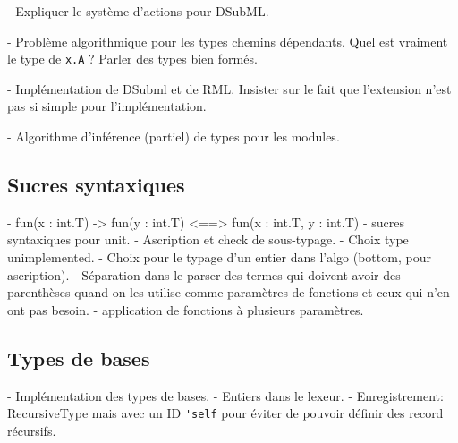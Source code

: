 - Expliquer le système d'actions pour DSubML.

- Problème algorithmique pour les types chemins dépendants. Quel est vraiment le
type de \verb|x.A| ? Parler des types bien formés.

- Implémentation de DSubml et de RML. Insister sur le fait que l'extension n'est
pas si simple pour l'implémentation.

- Algorithme d'inférence (partiel) de types pour les modules.

\subsection{Sucres syntaxiques}

- fun(x : int.T) -> fun(y : int.T) <==> fun(x : int.T, y : int.T)
- sucres syntaxiques pour unit.
- Ascription et check de sous-typage.
- Choix type unimplemented.
- Choix pour le typage d'un entier dans l'algo (bottom, pour ascription).
- Séparation dans le parser des termes qui doivent avoir des parenthèses quand
on les utilise comme paramètres de fonctions et ceux qui n'en ont pas besoin.
- application de fonctions à plusieurs paramètres.

\subsection{Types de bases}

- Implémentation des types de bases.
- Entiers dans le lexeur.
- Enregistrement: RecursiveType mais avec un ID \verb|'self| pour éviter de
pouvoir définir des record récursifs.